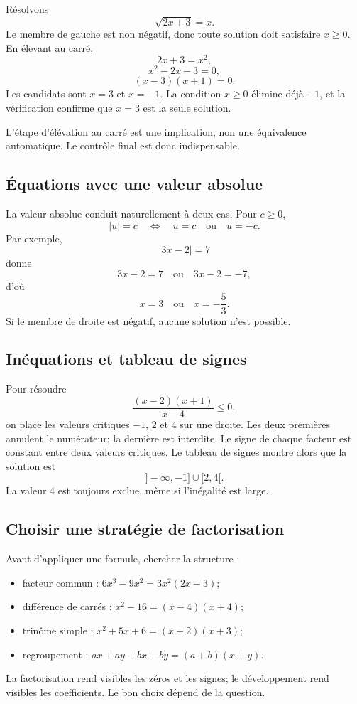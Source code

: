 \documentclass[12pt,a4paper,openany]{book}
\newcommand{\abs}[1]{\left\lvert #1\right\rvert}
\begin{document}
Résolvons
\[
\sqrt{2x+3}=x.
\]
Le membre de gauche est non négatif, donc toute solution doit satisfaire $x\geq0$. En élevant au carré,
\[
2x+3=x^2,
\]
\[
x^2-2x-3=0,
\]
\[
(x-3)(x+1)=0.
\]
Les candidats sont $x=3$ et $x=-1$. La condition $x\geq0$ élimine déjà $-1$, et la vérification confirme que $x=3$ est la seule solution.

L'étape d'élévation au carré est une implication, non une équivalence automatique. Le contrôle final est donc indispensable.

\subsection{Équations avec une valeur absolue}

La valeur absolue conduit naturellement à deux cas. Pour $c\geq0$,
\[
\abs{u}=c
\quad\Longleftrightarrow\quad
u=c\quad\text{ou}\quad u=-c.
\]
Par exemple,
\[
\abs{3x-2}=7
\]
donne
\[
3x-2=7\quad\text{ou}\quad3x-2=-7,
\]
d'où
\[
x=3\quad\text{ou}\quad x=-\frac53.
\]
Si le membre de droite est négatif, aucune solution n'est possible.

\subsection{Inéquations et tableau de signes}

Pour résoudre
\[
\frac{(x-2)(x+1)}{x-4}\leq0,
\]
on place les valeurs critiques $-1$, $2$ et $4$ sur une droite. Les deux premières annulent le numérateur; la dernière est interdite. Le signe de chaque facteur est constant entre deux valeurs critiques. Le tableau de signes montre alors que la solution est
\[
]-\infty,-1]\cup[2,4[.
\]
La valeur $4$ est toujours exclue, même si l'inégalité est large.

\subsection{Choisir une stratégie de factorisation}

Avant d'appliquer une formule, chercher la structure :
\begin{itemize}
\item facteur commun : $6x^3-9x^2=3x^2(2x-3)$;
\item différence de carrés : $x^2-16=(x-4)(x+4)$;
\item trinôme simple : $x^2+5x+6=(x+2)(x+3)$;
\item regroupement : $ax+ay+bx+by=(a+b)(x+y)$.
\end{itemize}
La factorisation rend visibles les zéros et les signes; le développement rend visibles les coefficients. Le bon choix dépend de la question.
\end{document}
